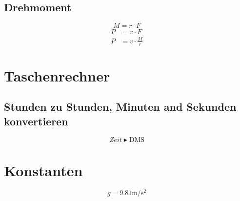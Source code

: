\documentclass[a4paper]{article}
\begin{document}
  \subsection{Drehmoment}
  \begin{equation}
    M = r \cdot F
  \end{equation}
  \begin{align}
    P &= v \cdot F \\
    P &= v \cdot \frac{M}{r}
  \end{align}

  \section{Taschenrechner}
  \subsection{Stunden zu Stunden, Minuten and Sekunden konvertieren}
  \begin{equation}
    Zeit \blacktriangleright \mbox{DMS}
  \end{equation}

  \section{Konstanten}
  \begin{equation}
    g = 9.81 \si{\metre\per\square\second}
  \end{equation}
\end{document}
